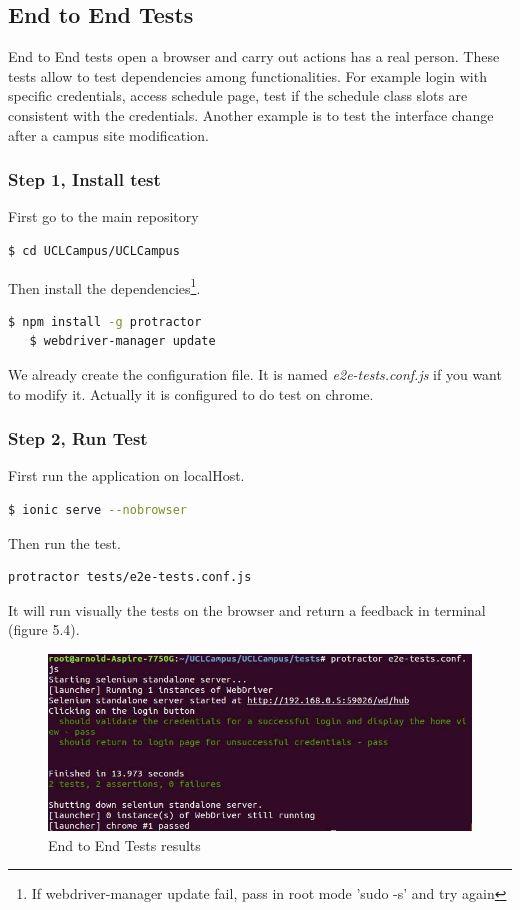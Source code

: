 \documentclass{eplmastersthesis}
\begin{document}
\subsection{End to End Tests}

End to End tests open a browser and carry out actions has a real person. These tests allow to test dependencies among functionalities. For example login with specific credentials, access schedule page, test if the schedule class slots are consistent with the credentials. Another example is to test the interface change after a campus site modification.

\subsubsection{Step 1, Install test}

First go to the main repository
\begin{lstlisting}[language=bash]
   $ cd UCLCampus/UCLCampus
\end{lstlisting}

Then install the dependencies\footnote{If webdriver-manager update fail, pass in root mode 'sudo -s' and try again}.
\begin{lstlisting}[language=bash]
   $ npm install -g protractor
   $ webdriver-manager update
\end{lstlisting}

We already create the configuration file. It is named\textit{ e2e-tests.conf.js} if you want to modify it. Actually it is configured to do test on chrome.

\subsubsection{Step 2, Run Test}

First run the application on localHost.

\begin{lstlisting}[language=bash]
   $ ionic serve --nobrowser
\end{lstlisting}

Then run the test.

\begin{lstlisting}[language=bash]
   protractor tests/e2e-tests.conf.js
\end{lstlisting}

It will run visually the tests on the browser and return a feedback in terminal (figure 5.4).

\begin{figure}[H]
\centering
\includegraphics[scale = 0.7]{Images/test2.png}
\caption{End to End Tests results}
\end{figure}
\end{document}

